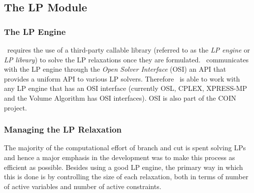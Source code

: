 
\subsection{The LP Module}

\subsubsection{The LP Engine}

\BB\ requires the use of a third-party callable library (referred
to as the {\em LP engine} or {\em LP library}) to solve the LP
relaxations once they are formulated. \BB\ communicates with the LP engine
through the {\em Open Solver Interface} (OSI) an API that provides a uniform
API to various LP solvers. Therefore \BB\ is able to work with any LP engine
that has an OSI interface (currently OSL, CPLEX, XPRESS-MP and the Volume
Algorithm has OSI interfaces). OSI is also part of the COIN \cite{W:coin-or}
project.

\subsubsection{Managing the LP Relaxation}
\label{lp-relaxation}

The majority of the computational effort of branch and cut is spent
solving LPs and hence a major emphasis in the development was to make
this process as efficient as possible. Besides using a good LP engine,
the primary way in which this is done is by controlling the size of
each relaxation, both in terms of number of active variables and
number of active constraints. 

